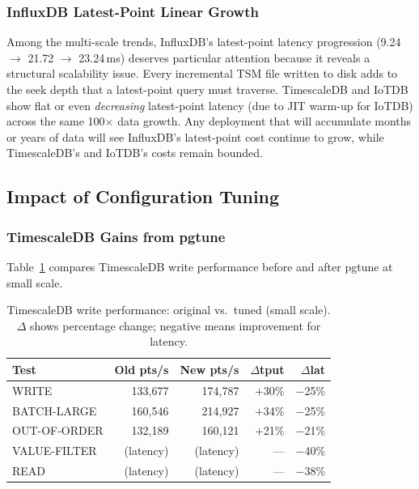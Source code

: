 \subsubsection{InfluxDB Latest-Point Linear Growth}

Among the multi-scale trends, InfluxDB's latest-point latency progression (9.24 $\to$
21.72 $\to$ 23.24\,ms) deserves particular attention because it reveals a structural
scalability issue. Every incremental TSM file written to disk adds to the seek depth
that a latest-point query must traverse. TimescaleDB and IoTDB show flat or even
\textit{decreasing} latest-point latency (due to JIT warm-up for IoTDB) across the
same 100$\times$ data growth. Any deployment that will accumulate months or years of
data will see InfluxDB's latest-point cost continue to grow, while TimescaleDB's
and IoTDB's costs remain bounded.

\subsection{Impact of Configuration Tuning}
\label{sec:tuning-results}

\subsubsection{TimescaleDB Gains from pgtune}

Table~\ref{tab:tsdb-tuning} compares TimescaleDB write performance before and after
pgtune at small scale.

\begin{table}[ht]
  \centering
  \caption{TimescaleDB write performance: original vs.\ tuned (small scale).
           $\Delta$ shows percentage change; negative means improvement for latency.}
  \label{tab:tsdb-tuning}
  \begin{tabular}{lrrrr}
    \hline
    \textbf{Test} & \textbf{Old pts/s} & \textbf{New pts/s} & $\Delta$tput & $\Delta$lat \\
    \hline
    WRITE        & 133{,}677 & 174{,}787 & $+$30\% & $-$25\% \\
    BATCH-LARGE  & 160{,}546 & 214{,}927 & $+$34\% & $-$25\% \\
    OUT-OF-ORDER & 132{,}189 & 160{,}121 & $+$21\% & $-$21\% \\
    VALUE-FILTER & (latency) & (latency) & ---     & $-$40\% \\
    READ         & (latency) & (latency) & ---     & $-$38\% \\
    \hline
  \end{tabular}
\end{table}


